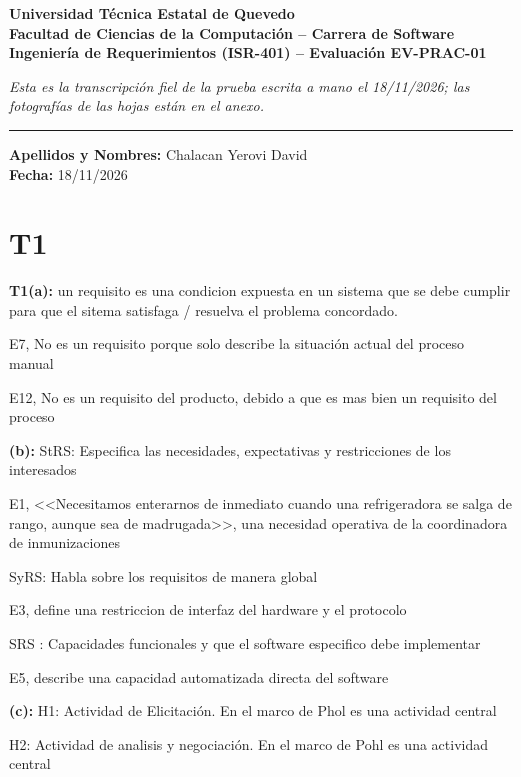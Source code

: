 \documentclass[11pt,a4paper]{article}
\begin{document}
\begin{center}
    \textbf{\Large Universidad Técnica Estatal de Quevedo}\\
    \textbf{Facultad de Ciencias de la Computación -- Carrera de Software}\\
    \textbf{Ingeniería de Requerimientos (ISR-401) -- Evaluación EV-PRAC-01}
\end{center}

\vspace{0.3cm}
\textit{Esta es la transcripción fiel de la prueba escrita a mano el 18/11/2026; las fotografías de las hojas están en el anexo.}
\vspace{0.3cm}

\hrule
\vspace{0.3cm}

\textbf{Apellidos y Nombres:} Chalacan Yerovi David \\
\textbf{Fecha:} 18/11/2026

\section*{T1}

\textbf{T1(a):} un requisito es una condicion expuesta en un sistema que se debe cumplir para que el sitema satisfaga / resuelva el problema concordado.

E7, No es un requisito porque solo describe la situación actual del proceso manual

E12, No es un requisito del producto, debido a que es mas bien un requisito del proceso

\textbf{(b):} StRS: Especifica las necesidades, expectativas y restricciones de los interesados

E1, <<Necesitamos enterarnos de inmediato cuando una refrigeradora se salga de rango, aunque sea de madrugada>>, una necesidad operativa de la coordinadora de inmunizaciones

SyRS: Habla sobre los requisitos de manera global

E3, define una restriccion de interfaz del hardware y el protocolo

SRS : Capacidades funcionales y que el software especifico debe implementar

E5, describe una capacidad automatizada directa del software

\textbf{(c):} H1: Actividad de Elicitación. En el marco de Phol es una actividad central

H2: Actividad de analisis y negociación. En el marco de Pohl es una actividad central
\end{document}
